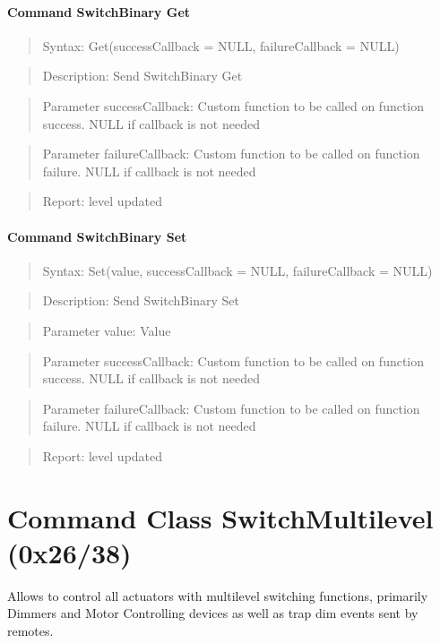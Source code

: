 \paragraph{Command SwitchBinary Get}
\begin{quote}Syntax: Get(successCallback = NULL, failureCallback = NULL)\end{quote}
\begin{quote}Description: Send SwitchBinary Get\end{quote}
\begin{quote}Parameter successCallback: Custom function to be called on function success. NULL if callback is not needed\end{quote}
\begin{quote}Parameter failureCallback: Custom function to be called on function failure. NULL if callback is not needed\end{quote}
\begin{quote}Report: level updated\end{quote}

\paragraph{Command SwitchBinary Set}
\begin{quote}Syntax: Set(value, successCallback = NULL, failureCallback = NULL)\end{quote}
\begin{quote}Description: Send SwitchBinary Set\end{quote}
\begin{quote}Parameter value: Value\end{quote}
\begin{quote}Parameter successCallback: Custom function to be called on function success. NULL if callback is not needed\end{quote}
\begin{quote}Parameter failureCallback: Custom function to be called on function failure. NULL if callback is not needed\end{quote}
\begin{quote}Report: level updated\end{quote}


\section{Command Class SwitchMultilevel (0x26/38)}

Allows to control all actuators with multilevel switching functions, primarily Dimmers and Motor Controlling devices as well as trap dim events sent by remotes.
\newline

